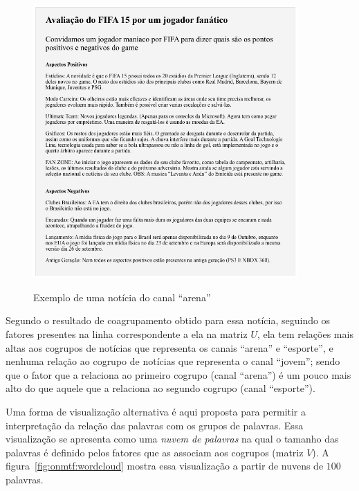 \documentclass[
    12pt,                %
    oneside,            %
    a4paper,            %
    english,            %
    brazil                %
    ]{abntex2ppgsi}
\begin{document}
\begin{figure}[H]
    \centering
    \caption{Exemplo de uma notícia do canal ``arena''}
    \includegraphics[width=0.90\textwidth]{img/arenaNews.png}
    \label{fig:sample-news}
\end{figure}

Segundo o resultado de coagrupamento obtido para essa notícia, seguindo os fatores presentes na linha correspondente a ela na matriz $U$, ela tem relações mais altas aos cogrupos de notícias que representa os canais ``arena'' e ``esporte'', e nenhuma relação ao cogrupo de notícias que representa o canal ``jovem''; sendo que o fator que a relaciona ao primeiro cogrupo (canal ``arena'') é um pouco mais alto do que aquele que a relaciona ao segundo cogrupo (canal ``esporte'').


Uma forma de visualização alternativa é aqui proposta para permitir a interpretação da relação das palavras com os grupos de palavras. Essa visualização se apresenta como uma \textit{nuvem de palavras} na qual o tamanho das palavras é definido pelos fatores que as associam aos cogrupos (matriz $V$).
A figura~\ref{fig:onmtf:wordcloud} mostra essa visualização a partir de nuvens de $100$ palavras.
\end{document}
